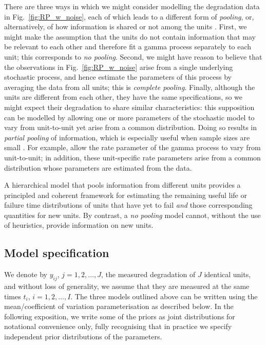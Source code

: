 \documentclass{article}
\begin{document}
There are three ways in which we might consider modelling the degradation data in Fig.~\ref{fig:RP_w_noise}, each of which leads to a different form of \emph{pooling}, or, alternatively, of how information is shared or not among the units \citep{Johnson_2022}. First, we might make the assumption that the units do not contain information that may be relevant to each other and therefore fit a gamma process separately to each unit; this corresponds to \emph{no pooling}. Second, we might have reason to believe that the observations in Fig.~\ref{fig:RP_w_noise} arise from a single underlying stochastic process, and hence estimate the parameters of this process by averaging the data from all units; this is \emph{complete pooling}. Finally, although the units are different from each other, they have the same specifications, so we might expect their degradation to share similar characteristics: this supposition can be modelled by allowing one or more parameters of the stochastic model to vary from unit-to-unit yet arise from a common distribution. Doing so results in \emph{partial pooling} of information, which is especially useful when sample sizes are small \cite[Section~13.1]{McElreath_2020}. For example, \citet{lawless_covariates_2004} allow the rate parameter of the gamma process to vary from unit-to-unit; in addition, these unit-specific rate parameters arise from a common distribution whose parameters are estimated from the data.

A hierarchical model that pools information from different units provides a principled and coherent framework for estimating the remaining useful life or failure time distributions of units that have yet to fail \textit{and} those corresponding quantities for new units. By contrast, a \textit{no pooling} model cannot, without the use of heuristics, provide information on new units. 

\subsection{Model specification}
\label{subsec:modelspec}

We denote by $y_{ij}$, $j = 1, 2, \ldots, J$, the measured degradation of $J$ identical units, and without loss of generality, we assume that they are measured at the same times $t_i$, $i = 1, 2, \ldots, I$. The three models outlined above can be written using the mean/coefficient of variation parameterisation as described below. In the following exposition, we write some of the priors as joint distributions for notational convenience only, fully recognising that in practice we specify independent prior distributions of the parameters. 
\end{document}
